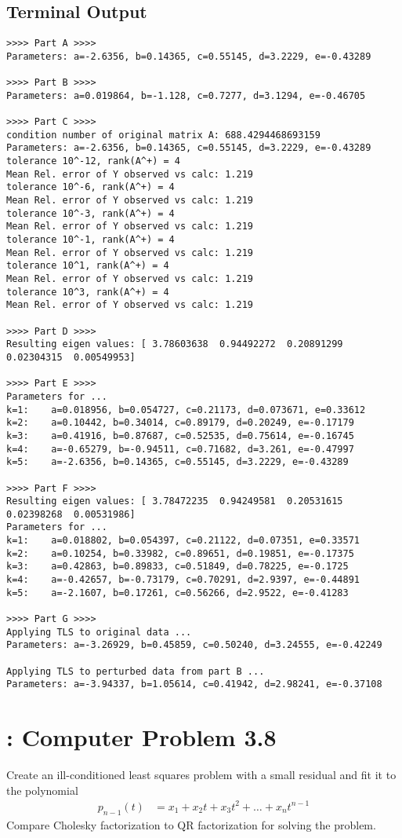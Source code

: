 \documentclass[paper=a4, fontsize=11pt]{scrartcl}
\numberwithin{equation}{section}		%
\numberwithin{figure}{section}			%
\numberwithin{table}{section}				%
\begin{document}
\subsection{Terminal Output}
\begin{verbatim}
>>>> Part A >>>>
Parameters: a=-2.6356, b=0.14365, c=0.55145, d=3.2229, e=-0.43289

>>>> Part B >>>>
Parameters: a=0.019864, b=-1.128, c=0.7277, d=3.1294, e=-0.46705

>>>> Part C >>>>
condition number of original matrix A: 688.4294468693159
Parameters: a=-2.6356, b=0.14365, c=0.55145, d=3.2229, e=-0.43289
tolerance 10^-12, rank(A^+) = 4
Mean Rel. error of Y observed vs calc: 1.219
tolerance 10^-6, rank(A^+) = 4
Mean Rel. error of Y observed vs calc: 1.219
tolerance 10^-3, rank(A^+) = 4
Mean Rel. error of Y observed vs calc: 1.219
tolerance 10^-1, rank(A^+) = 4
Mean Rel. error of Y observed vs calc: 1.219
tolerance 10^1, rank(A^+) = 4
Mean Rel. error of Y observed vs calc: 1.219
tolerance 10^3, rank(A^+) = 4
Mean Rel. error of Y observed vs calc: 1.219

>>>> Part D >>>>
Resulting eigen values: [ 3.78603638  0.94492272  0.20891299  0.02304315  0.00549953]

>>>> Part E >>>>
Parameters for ...
k=1:    a=0.018956, b=0.054727, c=0.21173, d=0.073671, e=0.33612
k=2:    a=0.10442, b=0.34014, c=0.89179, d=0.20249, e=-0.17179
k=3:    a=0.41916, b=0.87687, c=0.52535, d=0.75614, e=-0.16745
k=4:    a=-0.65279, b=-0.94511, c=0.71682, d=3.261, e=-0.47997
k=5:    a=-2.6356, b=0.14365, c=0.55145, d=3.2229, e=-0.43289

>>>> Part F >>>>
Resulting eigen values: [ 3.78472235  0.94249581  0.20531615  0.02398268  0.00531986]
Parameters for ...
k=1:    a=0.018802, b=0.054397, c=0.21122, d=0.07351, e=0.33571
k=2:    a=0.10254, b=0.33982, c=0.89651, d=0.19851, e=-0.17375
k=3:    a=0.42863, b=0.89833, c=0.51849, d=0.78225, e=-0.1725
k=4:    a=-0.42657, b=-0.73179, c=0.70291, d=2.9397, e=-0.44891
k=5:    a=-2.1607, b=0.17261, c=0.56266, d=2.9522, e=-0.41283

>>>> Part G >>>>
Applying TLS to original data ...
Parameters: a=-3.26929, b=0.45859, c=0.50240, d=3.24555, e=-0.42249

Applying TLS to perturbed data from part B ...
Parameters: a=-3.94337, b=1.05614, c=0.41942, d=2.98241, e=-0.37108

\end{verbatim}

\pagebreak
\section{: Computer Problem 3.8}
Create an ill-conditioned least squares problem with a small residual and fit it to the polynomial
\begin{align*}
	p_{n-1}(t) &= x_1 + x_2 t + x_3 t^2 + \dots + x_n t^{n-1}
\end{align*}
Compare Cholesky factorization to QR factorization for solving the problem.
\end{document}
